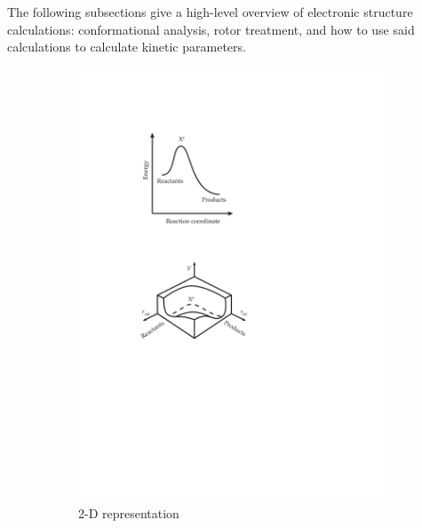 \documentclass[preprint, 11pt]{elsarticle} %
\begin{document}
The following subsections give a high-level overview of electronic structure calculations: conformational analysis, rotor treatment, and how to use said calculations to calculate kinetic parameters.

\begin{figure}[htbp]
\centering
\begin{subfigure}[t]{.5\textwidth}
  \centering
  \includegraphics{TST-2D-PES}
  \caption{2-D representation}
  \label{fig:sub1}
\end{subfigure}%
\begin{subfigure}[t]{.5\textwidth}
  \centering

\end{subfigure}
\end{figure}
\end{document}
